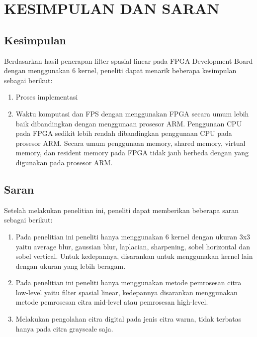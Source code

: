 
\chapter{KESIMPULAN DAN SARAN}

\section{Kesimpulan}
Berdasarkan hasil penerapan filter spasial linear pada FPGA Development Board dengan menggunakan 6 kernel, peneliti dapat menarik beberapa kesimpulan sebagai berikut:
\begin{enumerate}[topsep=0pt,itemsep=0pt,partopsep=0pt, parsep=0pt]
    \item Proses implementasi
    \item Waktu komputasi dan FPS dengan menggunakan FPGA secara umum lebih baik dibandingkan dengan menggunaan prosesor ARM. Penggunaan CPU pada FPGA sedikit lebih rendah dibandingkan penggunaan CPU pada prosesor ARM. Secara umum penggunaan memory, shared memory, virtual memory, dan resident memory pada FPGA tidak jauh berbeda dengan yang digunakan pada prosesor ARM.
\end{enumerate}


\section{Saran}
Setelah melakukan penelitian ini, peneliti dapat memberikan beberapa saran sebagai berikut:
\begin{enumerate}[topsep=0pt,itemsep=0pt,partopsep=0pt, parsep=0pt]
    \item Pada penelitian ini peneliti hanya menggunakan 6 kernel dengan ukuran 3x3 yaitu average blur, gaussian blur, laplacian, sharpening, sobel horizontal dan sobel vertical. Untuk kedepannya, disarankan untuk menggunakan kernel lain dengan ukuran yang lebih beragam.
    \item Pada penelitian ini peneliti hanya menggunakan metode pemrosesan citra low-level yaitu filter spasial linear, kedepannya disarankan menggunakan metode pemrosesan citra mid-level atau pemrosesan high-level.
    \item Melakukan pengolahan citra digital pada jenis citra warna, tidak terbatas hanya pada citra grayscale saja.
\end{enumerate}
